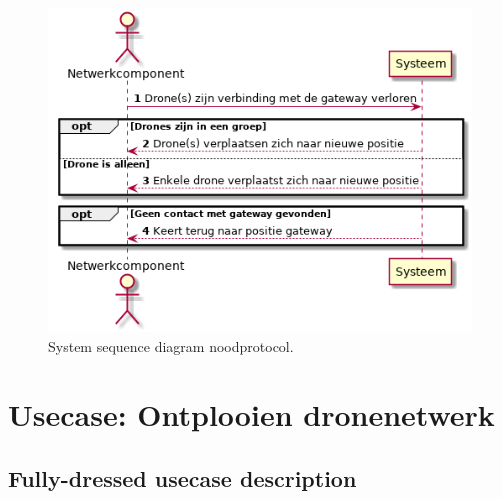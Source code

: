 \documentclass[a4paper, 11pt, oneside]{report}
\begin{document}
\begin{figure}[H]
	\begin{center}\includegraphics[height=.3\textheight]{UML/out/usecase/sequence/noodprotocol/noodprotocol.png}\end{center}
	\caption{System sequence diagram noodprotocol.}
	\label{fig:noodprotocol:systemsequence}
\end{figure}


\section[Ontplooien dronenetwerk]{Usecase: Ontplooien dronenetwerk}
\label{Usecase:ontplooien}
\subsection{Fully-dressed usecase description}
\label{Usecase:ontplooien:fully-dressed}
\end{document}
